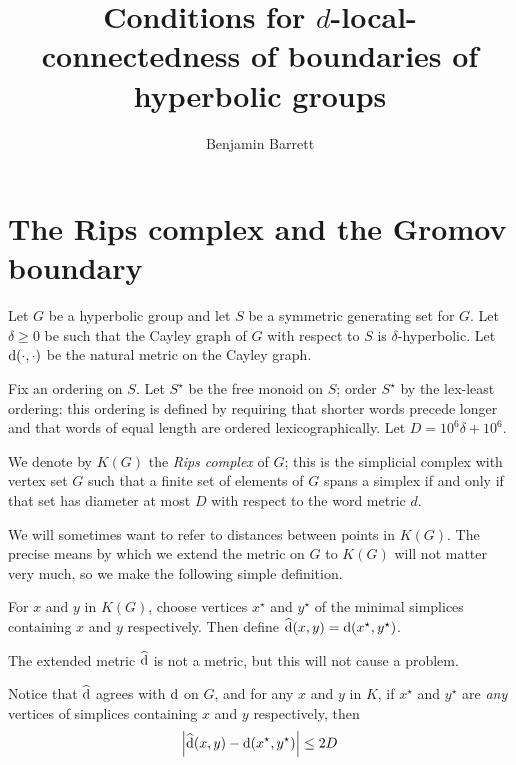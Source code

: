 \documentclass[a4paper]{article}
\title{Conditions for $d$-local-connectedness of boundaries of hyperbolic groups}
\author{Benjamin Barrett}
\begin{document}
\maketitle

\section{The Rips complex and the Gromov boundary}\label{sec:spheres}

Let $G$ be a hyperbolic group and let $S$ be a symmetric generating set for $G$.
Let $\delta \geq 0$ be such that the Cayley graph of $G$ with respect to $S$ is 
$\delta$-hyperbolic. Let $\operatorname{d}(\cdot, \cdot)$ be the natural metric on the
Cayley graph.

Fix an ordering on $S$. Let $S^\star$ be the free monoid on 
$S$; order $S^\star$ by the lex-least ordering: this ordering is defined by 
requiring that shorter words precede longer and that words of equal length are 
ordered lexicographically. Let $D = 10^6\delta + 10^6$.

\begin{definition}
  We denote by $K(G)$ the \emph{Rips complex} of $G$; this is the simplicial
  complex with vertex set $G$ such that a finite set of elements of $G$ spans a
  simplex if and only if that set has diameter at most $D$ with respect to the
  word metric $d$.
\end{definition}

We will sometimes want to refer to distances between points in $K(G)$. The
precise means by which we extend the metric on $G$ to $K(G)$ will not matter
very much, so we make the following simple definition.

\begin{definition}
  For $x$ and $y$ in $K(G)$, choose vertices $x^\star$ and $y^\star$ of the
  minimal simplices containing $x$ and $y$ respectively. Then define
  $\operatorname{\widehat{d}}(x,y) = \operatorname{d}(x^\star, y^\star)$.
\end{definition}

\begin{remark}\label{rem:dist_vs_newdist}
  The extended metric $\operatorname{\widehat{d}}$ is not a metric, but this will not cause a
  problem.

  Notice that $\operatorname{\widehat{d}}$ agrees with $\operatorname{d}$ on $G$, and for any $x$ and $y$ in
  $K$, if $x^\star$ and $y^\star$ are \emph{any} vertices of simplices
  containing $x$ and $y$ respectively, then
  \begin{equation*}
    \left|\operatorname{\widehat{d}}(x,y) - \operatorname{d}(x^\star, y^\star)\right| \leq 2D
  \end{equation*}
\end{remark}
\end{document}
